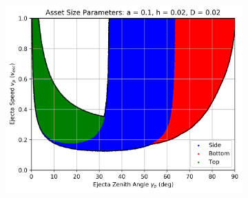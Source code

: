 \documentclass{article}
\begin{document}
\begin{figure}
	\begin{subfigure}[t]{.32\textwidth}
		\centering
		\includegraphics[width=.98\linewidth]{asset_speed_zenith_plot_1.010e+00_1.000e-01_2.000e-02_2.000e-02.png}  
		\label{fig:sub-asset_speed_zenith_h1_6}
	\end{subfigure}
	

\end{figure}
\end{document}
